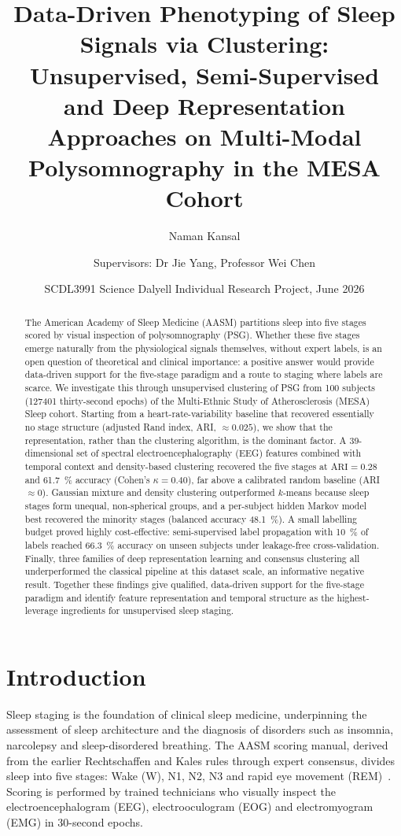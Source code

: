 \documentclass[11pt,a4paper]{article}
\title{\vspace{-1.2cm}\bfseries Data-Driven Phenotyping of Sleep Signals via
Clustering: Unsupervised, Semi-Supervised and Deep Representation Approaches on
Multi-Modal Polysomnography in the MESA Cohort}
\author[1]{Naman Kansal}
\author[1]{\normalsize Supervisors: Dr Jie Yang, Professor Wei Chen}
\affil[1]{\normalsize School of Biomedical Engineering, The University of Sydney}
\date{\normalsize SCDL3991 Science Dalyell Individual Research Project, June 2026}
\begin{document}
\maketitle

\begin{abstract}
\noindent\small
The American Academy of Sleep Medicine (AASM) partitions sleep into five stages
scored by visual inspection of polysomnography (PSG). Whether these five stages
emerge naturally from the physiological signals themselves, without expert labels,
is an open question of theoretical and clinical importance: a positive answer
would provide data-driven support for the five-stage paradigm and a route to
staging where labels are scarce. We investigate this through unsupervised
clustering of PSG from 100 subjects (\num{127401} thirty-second epochs) of the
Multi-Ethnic Study of Atherosclerosis (MESA) Sleep cohort. Starting from a
heart-rate-variability baseline that recovered essentially no stage structure
(adjusted Rand index, ARI, $\approx 0.025$), we show that the representation,
rather than the clustering algorithm, is the dominant factor. A 39-dimensional set
of spectral electroencephalography (EEG) features combined with temporal context
and density-based clustering recovered the five stages at $\text{ARI}=0.28$ and
\SI{61.7}{\percent} accuracy (Cohen's $\kappa=0.40$), far above a calibrated random
baseline (ARI $\approx 0$). Gaussian mixture and density clustering outperformed
$k$-means because sleep stages form unequal, non-spherical groups, and a
per-subject hidden Markov model best recovered the minority stages (balanced
accuracy \SI{48.1}{\percent}). A small labelling budget proved highly
cost-effective: semi-supervised label propagation with \SI{10}{\percent} of labels
reached \SI{66.3}{\percent} accuracy on unseen subjects under leakage-free
cross-validation. Finally, three families of deep representation learning and
consensus clustering all underperformed the classical pipeline at this dataset
scale, an informative negative result. Together these findings give qualified,
data-driven support for the five-stage paradigm and identify feature representation
and temporal structure as the highest-leverage ingredients for unsupervised sleep
staging.
\end{abstract}

\section{Introduction}
Sleep staging is the foundation of clinical sleep medicine, underpinning the
assessment of sleep architecture and the diagnosis of disorders such as insomnia,
narcolepsy and sleep-disordered breathing. The AASM scoring manual, derived from
the earlier Rechtschaffen and Kales rules through expert consensus, divides sleep
into five stages: Wake (W), N1, N2, N3 and rapid eye movement (REM)~\cite{aasm}.
Scoring is performed by trained technicians who visually inspect the
electroencephalogram (EEG), electrooculogram (EOG) and electromyogram (EMG) in
30-second epochs.
\end{document}
